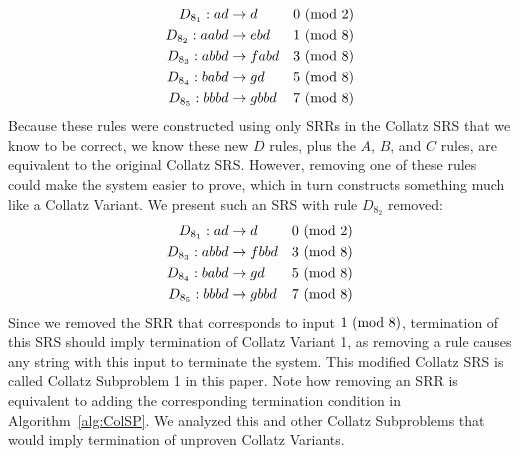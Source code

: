 \begin{align*}
    D_{8_1}: ad &\rightarrow d &\text{$0\ (\mathrm{mod}\ 2)$}\\
    D_{8_2}: aabd &\rightarrow ebd &\text{$1\ (\mathrm{mod}\ 8)$}\\
    D_{8_3}: abbd &\rightarrow fabd &\text{$3\ (\mathrm{mod}\ 8)$}\\
    D_{8_4}: babd &\rightarrow gd &\text{$5\ (\mathrm{mod}\ 8)$}\\
    D_{8_5}: bbbd &\rightarrow gbbd &\text{$7\ (\mathrm{mod}\ 8)$}
\end{align*}
Because these rules were constructed using only SRRs in the Collatz SRS that we know to be correct, we know these new $D$ rules, plus the $A$, $B$, and $C$ rules, are equivalent to the original Collatz SRS. However, removing one of these rules could make the system easier to prove, which in turn constructs something much like a Collatz Variant. We present such an SRS with rule $D_{8_2}$ removed:
\begin{align*}
    D_{8_1}: ad &\rightarrow d &\text{$0\ (\mathrm{mod}\ 2)$}\\
    D_{8_3}: abbd &\rightarrow fbbd &\text{$3\ (\mathrm{mod}\ 8)$}\\
    D_{8_4}: babd &\rightarrow gd &\text{$5\ (\mathrm{mod}\ 8)$}\\
    D_{8_5}: bbbd &\rightarrow gbbd &\text{$7\ (\mathrm{mod}\ 8)$}
\end{align*}
Since we removed the SRR that corresponds to input $1 \ (\mathrm{mod}\ 8)$, termination of this SRS should imply termination of Collatz Variant 1, as removing a rule causes any string with this input to terminate the system. This modified Collatz SRS is called Collatz Subproblem 1 in this paper. Note how removing an SRR is equivalent to adding the corresponding termination condition in Algorithm~\ref{alg:ColSP}.  We analyzed this and other Collatz Subproblems that would imply termination of unproven Collatz Variants.\par
